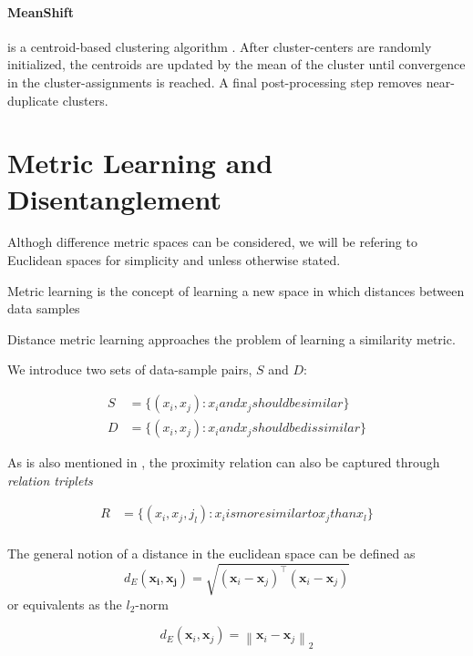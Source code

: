 \documentclass[a4paper,12pt,twoside,openright]{report}
\begin{document}
\paragraph{MeanShift} is a centroid-based clustering algorithm \cite{comaniciu02}.
After cluster-centers are randomly initialized, the centroids are updated by the mean of the cluster until convergence in the cluster-assignments is reached.
A final post-processing step removes near-duplicate clusters.


\section{Metric Learning and Disentanglement}

Althogh difference metric spaces can be considered, we will be refering to Euclidean spaces for simplicity and unless otherwise stated.

Metric learning is the concept of learning a new space in which distances between data samples 

Distance metric learning approaches the problem of learning a similarity metric.

We introduce two sets of data-sample pairs, $S$ and $D$:

\begin{align}
S &= \{ (x_i, x_j) : x_i and x_j should be similar\} \\
D &= \{ (x_i, x_j) : x_i and x_j should be dissimilar\}
\end{align}

As is also mentioned in \cite{moutafis17}, the proximity relation can also be captured through \textit{relation triplets}

\begin{align}
R &= \{ (x_i, x_j, j_l) : x_i is more similar to x_j than x_l \} \\
\end{align}

The general notion of a distance in the euclidean space can be defined as 
\begin{equation}
d_{E}\left(\boldsymbol{x}_{\boldsymbol{i}}, \boldsymbol{x}_{\boldsymbol{j}}\right)=\sqrt{\left(\boldsymbol{x}_{i}-\boldsymbol{x}_{j}\right)^{\top}\left(\boldsymbol{x}_{i}-\boldsymbol{x}_{j}\right)}
\end{equation}
or equivalents as the $l_2$-norm

\begin{equation}
d_{E}\left(\boldsymbol{x}_{i}, \boldsymbol{x}_{j}\right)=\left\|\boldsymbol{x}_{i}-\boldsymbol{x}_{j}\right\|_{2}
\end{equation}
\end{document}
